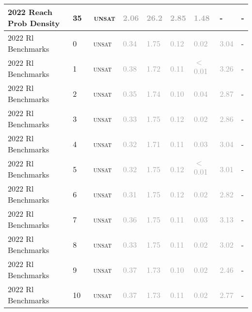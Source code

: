 \begin{center}
{\begin{longtable}{@{}lllllllll@{}}
2022 Reach Prob Density & 35 & ~\textsc{unsat} & \textcolor{darkgray}{2.06} & \textcolor{darkgray}{26.2} & \textcolor{darkgray}{2.85} & \textcolor{darkgray}{1.48} & - & - \\
\midrule
2022 Rl Benchmarks & 0 & ~\textsc{unsat} & \textcolor{darkgray}{0.34} & \textcolor{darkgray}{1.75} & \textcolor{darkgray}{0.12} & \textcolor{darkgray}{0.02} & \textcolor{darkgray}{3.04} & - \\
2022 Rl Benchmarks & 1 & ~\textsc{unsat} & \textcolor{darkgray}{0.38} & \textcolor{darkgray}{1.72} & \textcolor{darkgray}{0.11} & \textcolor{darkgray}{$<$0.01} & \textcolor{darkgray}{3.26} & - \\
2022 Rl Benchmarks & 2 & ~\textsc{unsat} & \textcolor{darkgray}{0.35} & \textcolor{darkgray}{1.74} & \textcolor{darkgray}{0.10} & \textcolor{darkgray}{0.04} & \textcolor{darkgray}{2.87} & - \\
2022 Rl Benchmarks & 3 & ~\textsc{unsat} & \textcolor{darkgray}{0.33} & \textcolor{darkgray}{1.75} & \textcolor{darkgray}{0.12} & \textcolor{darkgray}{0.02} & \textcolor{darkgray}{2.86} & - \\
2022 Rl Benchmarks & 4 & ~\textsc{unsat} & \textcolor{darkgray}{0.32} & \textcolor{darkgray}{1.71} & \textcolor{darkgray}{0.11} & \textcolor{darkgray}{0.03} & \textcolor{darkgray}{3.04} & - \\
2022 Rl Benchmarks & 5 & ~\textsc{unsat} & \textcolor{darkgray}{0.32} & \textcolor{darkgray}{1.75} & \textcolor{darkgray}{0.12} & \textcolor{darkgray}{$<$0.01} & \textcolor{darkgray}{3.01} & - \\
2022 Rl Benchmarks & 6 & ~\textsc{unsat} & \textcolor{darkgray}{0.31} & \textcolor{darkgray}{1.75} & \textcolor{darkgray}{0.12} & \textcolor{darkgray}{0.02} & \textcolor{darkgray}{2.82} & - \\
2022 Rl Benchmarks & 7 & ~\textsc{unsat} & \textcolor{darkgray}{0.36} & \textcolor{darkgray}{1.75} & \textcolor{darkgray}{0.11} & \textcolor{darkgray}{0.03} & \textcolor{darkgray}{3.13} & - \\
2022 Rl Benchmarks & 8 & ~\textsc{unsat} & \textcolor{darkgray}{0.33} & \textcolor{darkgray}{1.75} & \textcolor{darkgray}{0.11} & \textcolor{darkgray}{0.02} & \textcolor{darkgray}{3.02} & - \\
2022 Rl Benchmarks & 9 & ~\textsc{unsat} & \textcolor{darkgray}{0.37} & \textcolor{darkgray}{1.73} & \textcolor{darkgray}{0.10} & \textcolor{darkgray}{0.02} & \textcolor{darkgray}{2.46} & - \\
2022 Rl Benchmarks & 10 & ~\textsc{unsat} & \textcolor{darkgray}{0.37} & \textcolor{darkgray}{1.73} & \textcolor{darkgray}{0.11} & \textcolor{darkgray}{0.02} & \textcolor{darkgray}{2.77} & - \\

\end{longtable}}
\end{center}
